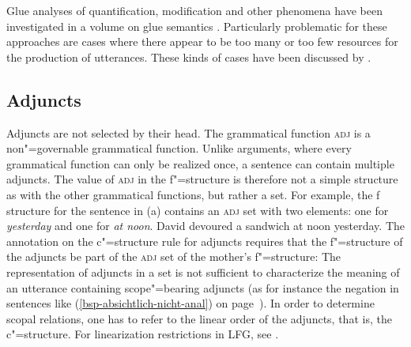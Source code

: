 Glue analyses of quantification, modification and other phenomena have been investigated in a volume on glue semantics \citep{Dalrymple99a-ed}. Particularly
problematic for these approaches are cases where there appear to be too many or too few resources for the production of utterances. These kinds of cases have been discussed
by \citet{Asudeh04a-u}.

\subsection{Adjuncts}
\label{Abschnitt-LFG-Adjunkte}

Adjuncts are not selected by their head. The grammatical function \textsc{adj} is a non"=governable grammatical function. Unlike arguments, where every grammatical
function can only be realized once, a sentence can contain multiple adjuncts. The value of \textsc{adj} in the f"=structure is therefore not a simple structure as with the other
grammatical functions, but rather a set. For example, the f structure for the sentence in (a)
contains an \textsc{adj} set with two elements: one for \emph{yesterday} and one for \emph{at noon}.
\eal
\ex\label{ex-david-devoured-a-sandwich-at-noon-yesterday} David devoured a sandwich at noon yesterday.
\ex\label{fstruc-david-devoured-a-sandwich-at-noon-yesterday} 
\zl
%
The annotation on the c"=structure rule for adjuncts requires that the f"=structure of the adjuncts
be part of the \textsc{adj} set of the mother's f"=structure:
\ea
{}
\z
The representation of adjuncts in a set is not sufficient to characterize the meaning of an
utterance containing scope"=bearing adjuncts (as for instance the negation in sentences like (\ref{bsp-absichtlich-nicht-anal})
on page~\pageref{bsp-absichtlich-nicht-anal}). In order to determine scopal relations, one has to
refer to the linear order of the adjuncts, that is, the c"=structure. For linearization
restrictions in LFG, see . 


